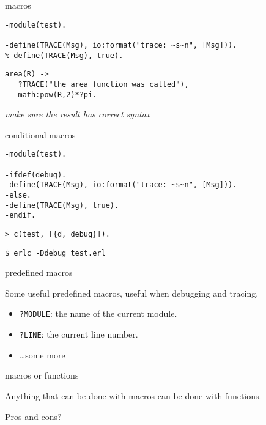 \begin{frame}[fragile]{macros}

\begin{verbatim}
-module(test).

-define(TRACE(Msg), io:format("trace: ~s~n", [Msg])).
%-define(TRACE(Msg), true).
\end{verbatim}

\pause
\begin{verbatim}
area(R) -> 
   ?TRACE("the area function was called"),
   math:pow(R,2)*?pi.
\end{verbatim}
\pause \vspace{20pt}

{\em make sure the result has correct syntax}

\end{frame}

\begin{frame}[fragile]{conditional macros}

\begin{verbatim}
-module(test).

-ifdef(debug).
-define(TRACE(Msg), io:format("trace: ~s~n", [Msg])).
-else.
-define(TRACE(Msg), true).
-endif.
\end{verbatim}

\pause
\begin{verbatim}
> c(test, [{d, debug}]).
\end{verbatim}
\pause \vspace{20pt}
\pause
\begin{verbatim}
$ erlc -Ddebug test.erl
\end{verbatim}
\pause

\end{frame}

\begin{frame}{predefined macros}

Some useful predefined macros, useful when debugging and tracing.

\begin{itemize}
\pause
\item {\tt ?MODULE}: the name of the current module.
\pause
\item {\tt ?LINE}: the current line number.
\pause
\item \ldots some more
\end{itemize}

\end{frame}

\begin{frame}{macros or functions}

Anything that can be done with macros can be done with functions.

\pause \vspace{20pt}

Pros and cons?

\end{frame}

